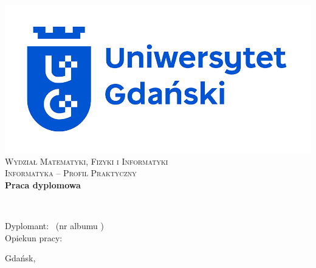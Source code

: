 \begin{titlepage}
    \begin{center}
        \includegraphics[keepaspectratio,scale=0.2]{./common/UG-logo.png} \\[.8cm]
        {\fontsize{17}{17}\selectfont
        \textsc{Wydział Matematyki, Fizyki i Informatyki  \\[.2cm]
        Informatyka – Profil Praktyczny  \\[1cm]}
        \textbf{Praca dyplomowa\\[1cm]}}
    \end{center}

    \begin{center}
        \large{\tytul}\\[2cm]
    \end{center}

    \begin{flushleft}
        \onehalfspacing
        \large
        Dyplomant: {\bf \dyplomant}\ (nr albumu {\bf \album}) \\
        Opiekun pracy: \opiekun \\
    \end{flushleft}
    \vskip1.0cm

    \vfill
    \begin{center}
        \large
        Gdańsk, \miesiac{} \rok{}
    \end{center}
\end{titlepage}
\restoregeometry

\singlespacing
\thispagestyle{empty}
\mbox{}
